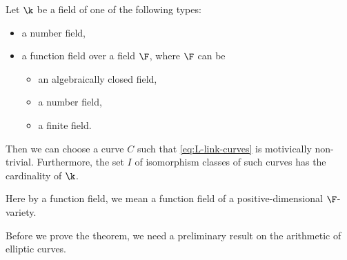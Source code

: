 \begin{theorem}
\notready\label{thm:ell-curves}
Let $\k$ be a
field
of one of the following types:
\begin{itemize}
    \item a number field,
    \item a function field over a field $\F$,
    where $\F$ can be
    \begin{itemize}
        \item an algebraically closed field,
        \item a number field,
        \item a finite field.
    \end{itemize}
\end{itemize}
Then we can choose a curve
$C$ such that \eqref{eq:L-link-curves} is motivically non-trivial.
Furthermore,
the set $I$ of isomorphism classes of such curves has the cardinality of $\k$.
\end{theorem}

Here by a function field, we mean
a function field of a positive-dimensional
$\F$-variety.



Before we prove the theorem, we need a preliminary result
on the arithmetic of elliptic curves.

